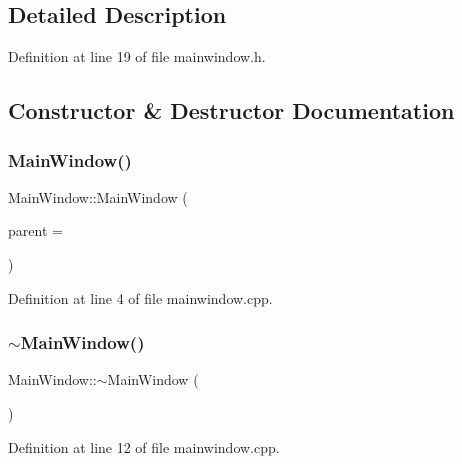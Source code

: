 \subsection{Detailed Description}


Definition at line 19 of file mainwindow.\+h.



\subsection{Constructor \& Destructor Documentation}
\mbox{\label{class_main_window_a8b244be8b7b7db1b08de2a2acb9409db}} 
\subsubsection{Main\+Window()\hspace{0.1cm}{\footnotesize\ttfamily [1/2]}}
{\footnotesize\ttfamily Main\+Window\+::\+Main\+Window (\begin{DoxyParamCaption}\item[{Q\+Widget $\ast$}]{parent = {} }\end{DoxyParamCaption})\hspace{0.3cm}{\ttfamily [explicit]}}



Definition at line 4 of file mainwindow.\+cpp.

\mbox{\label{class_main_window_ae98d00a93bc118200eeef9f9bba1dba7}} 
\subsubsection{$\sim$\+Main\+Window()\hspace{0.1cm}{\footnotesize\ttfamily [1/2]}}
{\footnotesize\ttfamily Main\+Window\+::$\sim$\+Main\+Window (\begin{DoxyParamCaption}{ }\end{DoxyParamCaption})}



Definition at line 12 of file mainwindow.\+cpp.

\mbox{\label{class_main_window_a8b244be8b7b7db1b08de2a2acb9409db}} 
